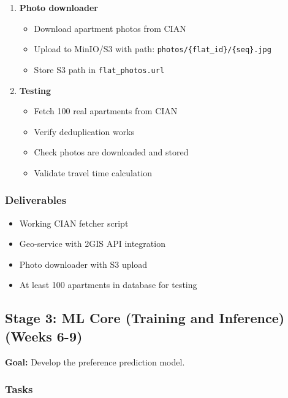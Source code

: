 \documentclass[12pt,a4paper]{article}
\begin{document}
\begin{enumerate}
    \item \textbf{Photo downloader}
    \begin{itemize}
        \item Download apartment photos from CIAN
        \item Upload to MinIO/S3 with path: \texttt{photos/\{flat\_id\}/\{seq\}.jpg}
        \item Store S3 path in \texttt{flat\_photos.url}
    \end{itemize}
    
    \item \textbf{Testing}
    \begin{itemize}
        \item Fetch 100 real apartments from CIAN
        \item Verify deduplication works
        \item Check photos are downloaded and stored
        \item Validate travel time calculation
    \end{itemize}
\end{enumerate}

\subsubsection{Deliverables}
\begin{itemize}
    \item Working CIAN fetcher script
    \item Geo-service with 2GIS API integration
    \item Photo downloader with S3 upload
    \item At least 100 apartments in database for testing
\end{itemize}

\subsection{Stage 3: ML Core (Training and Inference) (Weeks 6-9)}

\textbf{Goal:} Develop the preference prediction model.

\subsubsection{Tasks}
\end{document}
